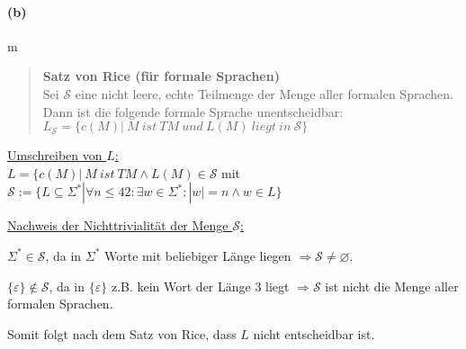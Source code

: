 	\vspace{0.3cm}

\paragraph{(b)}m
	\begin{quote}	
		\textbf{Satz von Rice (für formale Sprachen)}\\
		Sei $\mathcal{S} $ eine nicht leere, echte Teilmenge der Menge aller formalen Sprachen.\\
		Dann ist die folgende formale Sprache unentscheidbar:\\
		$L_\mathcal{S}  = \{c(M) |\ M\ ist\ TM\ und\ L(M)\ liegt\ in\ \mathcal{S}\}$
	\end{quote}
	
	\underline{Umschreiben von $L$:}\\
	$L=\{c(M)|\ M\ ist\ TM \wedge L(M) \in \mathcal{S}$ mit $\mathcal{S} := \{L\subseteq \Sigma^* | \forall n \leq 42: \exists w \in \Sigma^*: |w|=n \wedge w \in L\}$

	\underline{Nachweis der Nichttrivialität der Menge $\mathcal{S}$:}

	$\Sigma^* \in \mathcal{S}$, da in $\Sigma^*$ Worte mit beliebiger Länge liegen $\Rightarrow \mathcal{S} \neq \varnothing$.

	$\{\varepsilon\} \notin \mathcal{S}$, da in $\{\varepsilon\}$ z.B. kein Wort der Länge 3 liegt $\Rightarrow \mathcal{S}$ ist nicht die Menge aller formalen Sprachen.

	Somit folgt nach dem Satz von Rice, dass $L$ nicht entscheidbar ist.



\newpage